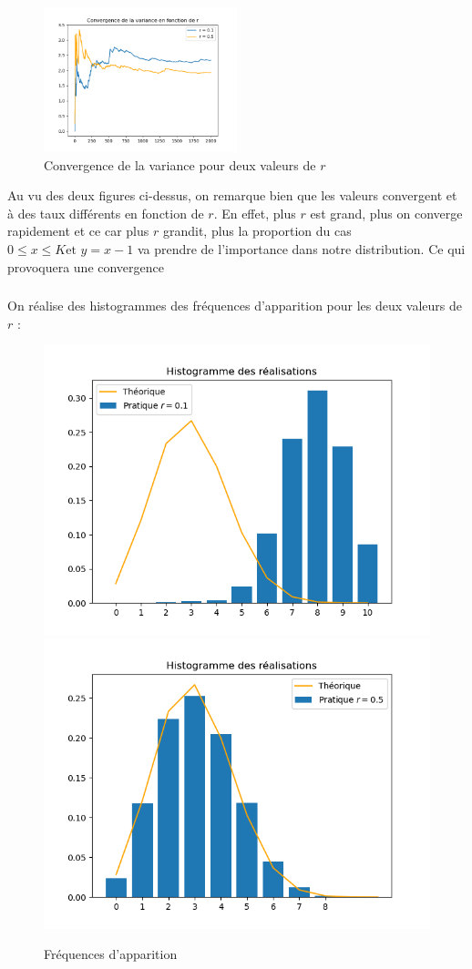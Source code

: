 \begin{figure}[H]
  \centering
  \includegraphics[width=0.5\textwidth]{figs/convergence_var.png}
  \caption{Convergence de la variance pour deux valeurs de $r$}
\end{figure}

Au vu des deux figures ci-dessus, on remarque bien que les valeurs convergent et à des taux différents en fonction de $r$. En effet, plus $r$ est grand, plus on converge rapidement et ce car 
plus $r$ grandit, plus la proportion du cas $0 \leq x \leq K \text{et } y = x-1$ va prendre de l'importance dans notre distribution. Ce qui provoquera une convergence 

\subsubsection{}
On réalise des histogrammes des fréquences d'apparition pour les deux valeurs de $r$ :

\begin{figure}[!h]
  \centering
  \includegraphics[width=.5\textwidth]{figs/histo1.png}
  \includegraphics[width=.5\textwidth]{figs/histo2.png}
  \caption{Fréquences d'apparition}
\end{figure}